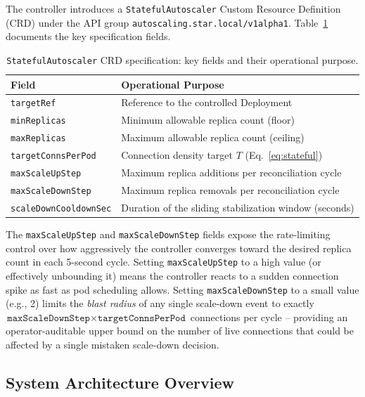 \documentclass[twocolumn]{svjour3}
\begin{document}
The controller introduces a \texttt{StatefulAutoscaler} Custom Resource Definition (CRD)
under the API group \texttt{autoscaling.star.local/v1alpha1}. Table~\ref{tab:crd} documents the
key specification fields.

\begin{table}[ht]
\centering
\caption{\texttt{StatefulAutoscaler} CRD specification: key fields and their operational
purpose.}
\label{tab:crd}
\begin{tabular}{@{}lp{4.6cm}@{}}
\toprule
\rowcolor{gray!12}
\textbf{Field} & \textbf{Operational Purpose} \\
\midrule
\texttt{targetRef} & Reference to the controlled Deployment \\
\texttt{minReplicas} & Minimum allowable replica count (floor) \\
\texttt{maxReplicas} & Maximum allowable replica count (ceiling) \\
\texttt{targetConnsPerPod} & Connection density target $T$ (Eq.~\ref{eq:stateful}) \\
\texttt{maxScaleUpStep} & Maximum replica additions per reconciliation cycle \\
\texttt{maxScaleDownStep} & Maximum replica removals per reconciliation cycle \\
\texttt{scaleDownCooldownSec} & Duration of the sliding stabilization window (seconds) \\
\bottomrule
\end{tabular}
\end{table}

The \texttt{maxScaleUpStep} and \texttt{maxScaleDownStep} fields expose the rate-limiting
control over how aggressively the controller converges toward the desired replica count in
each 5-second cycle. Setting \texttt{maxScaleUpStep} to a high value (or effectively
unbounding it) means the controller reacts to a sudden connection spike as fast as pod
scheduling allows. Setting \texttt{maxScaleDownStep} to a small value (e.g., 2) limits the
\textit{blast radius} of any single scale-down event to exactly
$\texttt{maxScaleDownStep} \times \texttt{targetConnsPerPod}$ connections per cycle --
providing an operator-auditable upper bound on the number of live connections that could be
affected by a single mistaken scale-down decision.

\subsection{System Architecture Overview}
\end{document}
